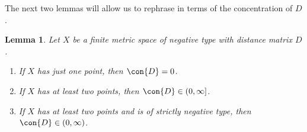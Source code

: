 \documentclass[a4paper, oneside, reqno]{amsart}
\newtheorem{lemma}[theorem]{Lemma}
\theoremstyle{definition}
\theoremstyle{remark}
\numberwithin{equation}{section}
\begin{document}
The next two lemmas will allow us to rephrase  in terms of the concentration of \(D\).

\begin{lemma}
    \label{lemma:neg-type-mag-finite}
    Let \(X\) be a finite metric space of negative type with distance matrix \(D\).
    \begin{enumerate}
    \item If \(X\) has just one point, then \(\con{D} = 0\). \label{lemma:neg-type-mag-finite1}
    \item If \(X\) has at least two points, then \(\con{D} \in (0,\infty]\). \label{lemma:neg-type-mag-finite2}
    \item If \(X\) has at least two points and is of strictly negative type, then \(\con{D} \in (0, \infty)\). \label{lemma:neg-type-mag-finite3}
    \end{enumerate}
\end{lemma}
\end{document}

